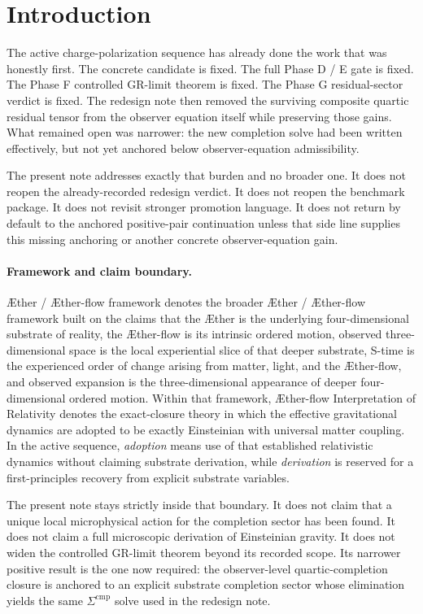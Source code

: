 \documentclass[11pt]{article}
\newcommand{\Aether}{\AE{}ther}
\newcommand{\Aflow}{\AE{}ther-flow}
\newcommand{\TheoryName}{\Aflow{} Interpretation of Relativity}
\newcommand{\TheoryProgram}{\Aether{} / \Aflow{} framework}
\newcommand{\CompShift}{\Sigma^{\mathrm{cmp}}}
\begin{document}
\section{Introduction}

The active charge-polarization sequence has already done the work that was honestly first. The concrete candidate is fixed. The full Phase D / E gate is fixed. The Phase F controlled GR-limit theorem is fixed. The Phase G residual-sector verdict is fixed. The redesign note then removed the surviving composite quartic residual tensor from the observer equation itself while preserving those gains. What remained open was narrower: the new completion solve had been written effectively, but not yet anchored below observer-equation admissibility.

The present note addresses exactly that burden and no broader one. It does not reopen the already-recorded redesign verdict. It does not reopen the benchmark package. It does not revisit stronger promotion language. It does not return by default to the anchored positive-pair continuation unless that side line supplies this missing anchoring or another concrete observer-equation gain.

\paragraph{Framework and claim boundary.}
\TheoryProgram{} denotes the broader \Aether{} / \Aflow{} framework built on the claims that the \Aether{} is the underlying four-dimensional substrate of reality, the \Aflow{} is its intrinsic ordered motion, observed three-dimensional space is the local experiential slice of that deeper substrate, S-time is the experienced order of change arising from matter, light, and the \Aflow{}, and observed expansion is the three-dimensional appearance of deeper four-dimensional ordered motion. Within that framework, \TheoryName{} denotes the exact-closure theory in which the effective gravitational dynamics are adopted to be exactly Einsteinian with universal matter coupling. In the active sequence, \emph{adoption} means use of that established relativistic dynamics without claiming substrate derivation, while \emph{derivation} is reserved for a first-principles recovery from explicit substrate variables.

The present note stays strictly inside that boundary. It does not claim that a unique local microphysical action for the completion sector has been found. It does not claim a full microscopic derivation of Einsteinian gravity. It does not widen the controlled GR-limit theorem beyond its recorded scope. Its narrower positive result is the one now required: the observer-level quartic-completion closure is anchored to an explicit substrate completion sector whose elimination yields the same \(\CompShift\) solve used in the redesign note.
\end{document}
